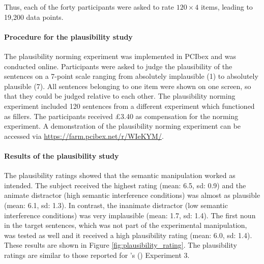 \documentclass[a4paper, man, floatsintext]{apa7}
\begin{document}
Thus, each of the forty participants were asked to rate $120 \times 4$ items, leading to 19,200 data points.

\paragraph{Procedure for the plausibility study}
The plausibility norming experiment was implemented in PCIbex \citep{pcibex} and was conducted online. Participants were asked to judge the plausibility of the sentences on a 7-point scale ranging from absolutely implausible (1) to absolutely plausible (7). All sentences belonging to one item were shown on one screen, so that they could be judged relative to each other. The plausibility norming experiment included 120 sentences from a different experiment which functioned as fillers. The participants received \pounds 3.40 as compensation for the norming experiment. A demonstration of the plausibility norming experiment can be accessed via \hyperlink{https://farm.pcibex.net/r/WIeKYM/}{https://farm.pcibex.net/r/WIeKYM/}.

\paragraph{Results of the plausibility study}
The plausibility ratings showed that the semantic manipulation worked as intended. The subject received the highest rating (mean: 6.5, sd: 0.9) and the animate distractor (high semantic interference conditions) was almost as plausible (mean: 6.1, sd: 1.3). In contrast, the inanimate distractor (low semantic interference conditions) was very implausible (mean: 1.7, sd: 1.4). The first noun in the target sentences, which was not part of the experimental manipulation, was tested as well and it received a high plausibility rating (mean: 6.0, sd: 1.4). These results are shown in Figure \ref{fig:plausibility_rating}. The plausibility ratings are similar to those reported for \citeauthor{vandyke07}'s (\citeyear{vandyke07}) Experiment 3.
\end{document}
